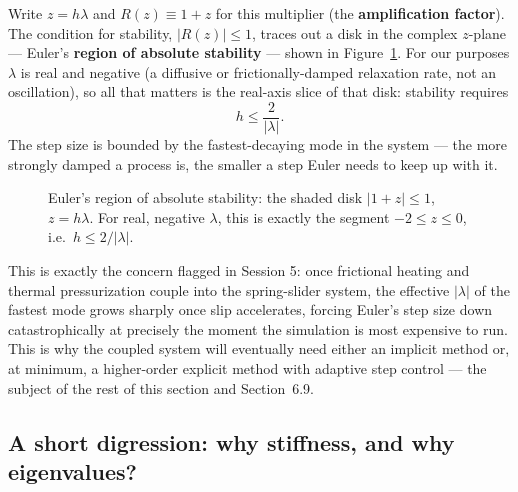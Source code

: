 Write $z = h\lambda$ and $R(z) \equiv 1+z$ for this multiplier (the \textbf{amplification factor}). The condition for stability, $|R(z)|\le 1$, traces out a disk in the complex $z$-plane --- Euler's \textbf{region of absolute stability} --- shown in Figure~\ref{fig:euler-stability-disk}. For our purposes $\lambda$ is real and negative (a diffusive or frictionally-damped relaxation rate, not an oscillation), so all that matters is the real-axis slice of that disk: stability requires
\begin{equation}
h \le \frac{2}{|\lambda|}.
\end{equation}
The step size is bounded by the fastest-decaying mode in the system --- the more strongly damped a process is, the smaller a step Euler needs to keep up with it.

\begin{figure}[h]
\centering
{}
\caption{Euler's region of absolute stability: the shaded disk $|1+z|\le1$, $z=h\lambda$. For real, negative $\lambda$, this is exactly the segment $-2\le z \le 0$, i.e.\ $h\le 2/|\lambda|$.}
\label{fig:euler-stability-disk}
\end{figure}

\begin{remark}
This is exactly the concern flagged in Session 5: once frictional heating and thermal pressurization couple into the spring-slider system, the effective $|\lambda|$ of the fastest mode grows sharply once slip accelerates, forcing Euler's step size down catastrophically at precisely the moment the simulation is most expensive to run. This is why the coupled system will eventually need either an implicit method or, at minimum, a higher-order explicit method with adaptive step control --- the subject of the rest of this section and Section~6.9.
\end{remark}

\subsection*{A short digression: why stiffness, and why eigenvalues?}

